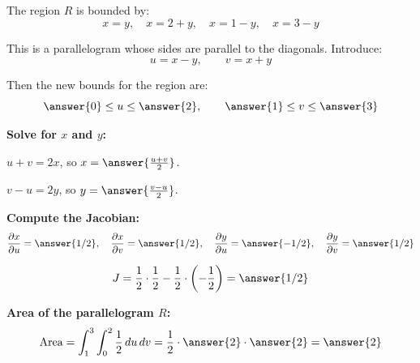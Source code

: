 \documentclass{ximera}
\begin{document}
\begin{problem}
The region $R$ is bounded by:
$$x = y,\quad x = 2+y,\quad x = 1-y,\quad x = 3-y$$

This is a parallelogram whose sides are parallel to the diagonals.  Introduce:
$$u = x - y, \qquad v = x + y$$

Then the new bounds for the region are:
$$\answer{0} \leq u \leq \answer{2}, \qquad \answer{1} \leq v \leq \answer{3}$$

\textbf{Solve for $x$ and $y$:}

$u + v = 2x$, so $x = \answer{\frac{u+v}{2}}$.

$v - u = 2y$, so $y = \answer{\frac{v-u}{2}}$.

\textbf{Compute the Jacobian:}
$$\frac{\partial x}{\partial u} = \answer{1/2}, \quad \frac{\partial x}{\partial v} = \answer{1/2}, \quad \frac{\partial y}{\partial u} = \answer{-1/2}, \quad \frac{\partial y}{\partial v} = \answer{1/2}$$

$$J = \frac{1}{2}\cdot\frac{1}{2} - \frac{1}{2}\cdot\left(-\frac{1}{2}\right) = \answer{1/2}$$

\textbf{Area of the parallelogram $R$:}
$$\text{Area} = \int_1^3\int_0^2 \frac{1}{2}\,du\,dv = \frac{1}{2}\cdot\answer{2}\cdot\answer{2} = \answer{2}$$


\end{problem}
\end{document}
